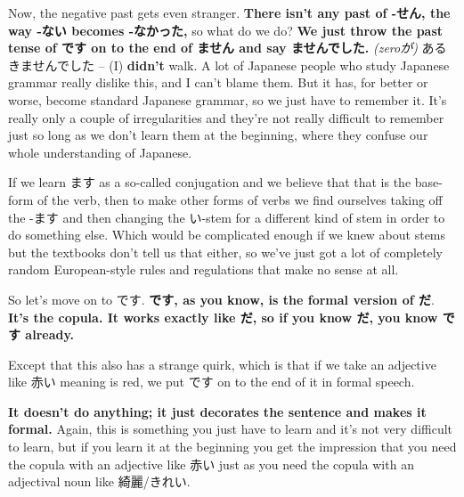 \stopsectionlevel

\startsectionlevel[title={ませんでした},reference={ませんでした}]

Now, the negative past gets even stranger. {\bf There isn't any past of -せん, the way -ない becomes -なかった,} so what do we do? {\bf We just throw the past tense of です on to the end of ません and say ませんでした.} {\em (zeroが)} あるきませんでした -- (I) {\bf didn't} walk. A lot of Japanese people who study Japanese grammar really dislike this, and I can't blame them. But it has, for better or worse, become standard Japanese grammar, so we just have to remember it. It's really only a couple of irregularities and they're not really difficult to remember just so long as we don't learn them at the beginning, where they confuse our whole understanding of Japanese.

\thinrule

If we learn ます as a so-called conjugation and we believe that that is the base-form of the verb, then to make other forms of verbs we find ourselves taking off the -ます and then changing the い-stem for a different kind of stem in order to do something else. Which would be complicated enough if we knew about stems but the textbooks don't tell us that either, so we've just got a lot of completely random European-style rules and regulations that make no sense at all.

\stopsectionlevel

\stopsectionlevel

\startsectionlevel[title={です},reference={です}]

So let's move on to です. {\bf です, as you know, is the formal version of だ}. {\bf It's the copula. It works exactly like だ, so if you know だ, you know です already.}

{}

Except that this also has a strange quirk, which is that if we take an adjective like 赤い meaning is red, we put です on to the end of it in formal speech.

{}

{\bf It doesn't do anything; it just decorates the sentence and makes it formal.} Again, this is something you just have to learn and it's not very difficult to learn, but if you learn it at the beginning you get the impression that you need the copula with an adjective like 赤い just as you need the copula with an adjectival noun like 綺麗/きれい.

